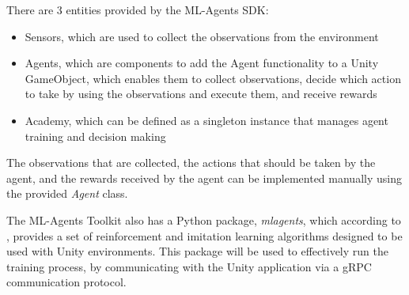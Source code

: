 There are 3 entities provided by the ML-Agents SDK:
\begin{itemize}
    \item Sensors, which are used to collect the observations from the environment
    \item Agents, which are components to add the Agent functionality to a Unity GameObject, which enables them to collect observations, decide which action to take by using the observations and execute them, and receive rewards
    \item Academy, which can be defined as a singleton instance that manages agent training and decision making \cite{mlagents_api_docs}
\end{itemize}

The observations that are collected, the actions that should be taken by the agent, and the rewards received by the agent can be implemented manually using the provided \emph{Agent} class.

The ML-Agents Toolkit also has a Python package, \emph{mlagents}, which according to \cite{mlagents_pypi}, provides a set of reinforcement and imitation learning algorithms designed to be used with Unity environments. This package will be used to effectively run the training process, by communicating with the Unity application via a gRPC communication protocol.

